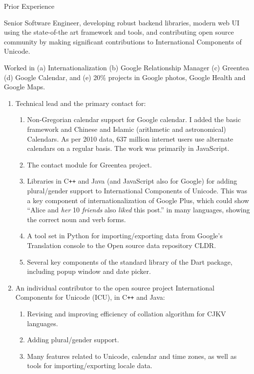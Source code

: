 \documentclass{resume}
\newcommand{\CC}{C{\tt ++}}
\begin{document}
\begin{category}{Prior Experience}


  Senior Software Engineer, developing robust backend libraries, modern web UI using the state-of-the art framework and tools, and contributing open
  source community by making significant contributions to International Components of Unicode.

  Worked in (a) Internationalization (b) Google Relationship Manager (c) Greentea (d) Google Calendar, and (e) 20\% projects in Google photos, 
  Google Health and Google Maps.
  
  \begin{enumerate}
  \item Technical lead and the primary contact for:
  \begin{enumerate}
    \item Non-Gregorian calendar support for Google calendar.  I added the basic framework and Chinese and Islamic
    (arithmetic and astronomical) Calendars. As per 2010 data, 637 million internet users use alternate calendars on a regular basis. The work was primarily in JavaScript.
    \item The contact module for Greentea project.
    \item Libraries in \CC{} and Java (and JavaScript also for Google)
      for adding plural/gender support to International Components of Unicode.  This was a key component of internationalization of Google Plus, which could show ``Alice and \emph{her} 10 \emph{friends}
      also \emph{liked} this post.'' in many languages, showing the correct noun and verb forms.
    \item A tool set in Python for importing/exporting data from Google's Translation console to the Open source data repository CLDR.
    \item Several key components of the standard library of the Dart package, including popup window and date picker.
  \end{enumerate}
  \item An individual contributor to the open source project International Components for Unicode (ICU), in \CC{} and Java:
  \begin{enumerate}
  \item Revising and improving efficiency of collation algorithm for CJKV languages.
  \item Adding plural/gender support.
  \item Many features related to Unicode, calendar and time zones, as well as tools for importing/exporting locale data.
  \end{enumerate}
  

\end{enumerate}
\end{category}
\end{document}
